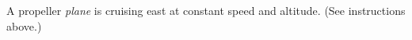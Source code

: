  A propeller \emph{plane} is cruising east at constant
speed and altitude.
(See instructions above.)
